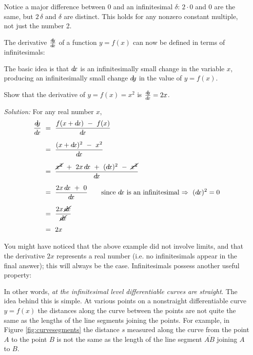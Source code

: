 Notice a major difference between 0 and an infinitesimal $\delta$: $2 \cdot 0$
and $0$ are the same, but $2\,\delta$ and $\delta$ are distinct. This holds for
any nonzero constant multiple, not just the number 2.

The derivative $\frac{d\negmedspace y}{d\!x}$ of a function $y=f(x)$ can now be defined in terms of
infinitesimals:

The basic idea is that $d\!x$ is an infinitesimally small change in the variable
$x$, producing an infinitesimally small change $d\!y$ in the value of $y=f(x)$.
\begin{exmp}
 Show that the derivative of $y=f(x)=x^2$ is $\frac{d\negmedspace y}{d\!x} = 2x$.\vspace{1mm}
 \par\noindent\emph{Solution:} For any real number $x$,
 \begin{align*}
  \dydx ~&=~ \frac{f(x+\dx) ~-~ f(x)}{\dx}\\[6pt]
  &=~ \frac{(x+\dx)^2 ~-~ x^2}{\dx}\\[6pt]
  &=~ \frac{\cancel{x^2} ~+~ 2x\,\dx ~+~ (\dx)^2 ~-~ \cancel{x^2}}{\dx}\\[6pt]
  &=~ \frac{2x\,\dx ~+~ 0}{\dx}\qquad\text{since $\dx$ is an
   infinitesimal $\Rightarrow ~(\dx)^2 = 0$}\\[6pt]
  &=~ \frac{2x\,\cancel{\dx}}{\cancel{\dx}}\\[4pt]
  &=~ 2x
 \end{align*}
\end{exmp}

\divider

\newpage
You might have noticed that the above example did not involve limits, and that
the derivative $2x$ represents a real number (i.e. no infinitesimals appear in
the final answer); this will always be the case. Infinitesimals possess another
useful property:


In other words, \emph{at the infinitesimal level differentiable curves are
straight}. The idea behind this is simple. At various points on a nonstraight
differentiable curve $y=f(x)$ the distances along the curve between the points
are not quite the same as the lengths of the line segments joining the points.
For example, in Figure \ref{fig:curvesegments} the distance $s$ measured along
the curve from the point $A$ to the point $B$ is not the same as the length of
the line segment $\overline{AB}$ joining $A$ to $B$.

